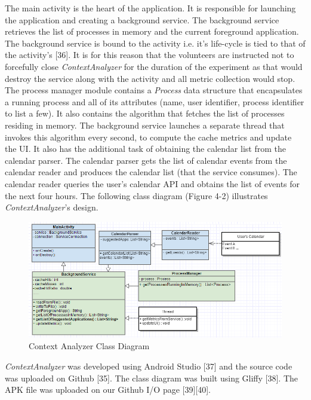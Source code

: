 \documentclass[12pt]{uthesis-v12}  %
\begin{document}
		The main activity is the heart of the application. It is responsible for launching the application and creating a background service. The background service retrieves the list of processes in memory and the current foreground application. The background service is bound to the activity i.e. it's life-cycle is tied to that of the activity's [36]. It is for this reason that the volunteers are instructed not to forcefully close {\em ContextAnalyzer} for the duration of the experiment as that would destroy the service along with the activity and all metric collection would stop. The process manager module contains a {\em Process} data structure that encapsulates a running process and all of its attributes (name, user identifier, process identifier to list a few). It also contains the algorithm that fetches the list of processes residing in memory. The background service launches a separate thread that invokes this algorithm every second, to compute the cache metrics and update the UI. It also has the additional task of obtaining the calendar list from the calendar parser. The calendar parser gets the list of calendar events from the calendar reader and produces the calendar list (that the service consumes). The calendar reader queries the user's calendar API and obtains the list of events for the next four hours. The following class diagram (Figure 4-2) illustrates {\em ContextAnalyzer}'s design.
	
		\begin{figure}[h]
			\centering
			\includegraphics[width = 150mm]{images/contextAnalyzerDesign.png}
			\caption[Context Analyzer Class Diagram]{Context Analyzer Class Diagram}
		\end{figure}
		   

		{\em ContextAnalyzer} was developed using Android Studio [37] and the source code was uploaded on Github [35]. The class diagram was built using Gliffy [38]. The APK file was uploaded on our Github I/O page [39][40].
\end{document}

